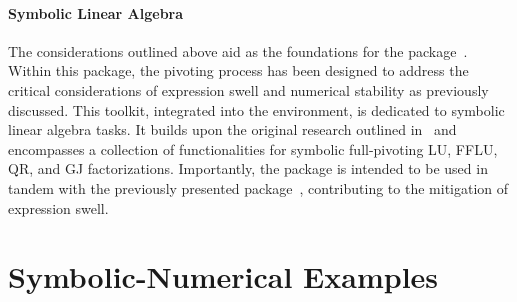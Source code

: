 \paragraph{Symbolic Linear Algebra} The considerations outlined above aid as the foundations for the \LAST{} package~\cite{last}. Within this package, the pivoting process has been designed to address the critical considerations of expression swell and numerical stability as previously discussed. This toolkit, integrated into the \Maple{} environment, is dedicated to symbolic linear algebra tasks. It builds upon the original research outlined in~\cite{zhou2008fraction} and encompasses a collection of functionalities for symbolic full-pivoting \ac{LU}, \ac{FFLU}, QR, and \ac{GJ} factorizations. Importantly, the \LAST{} package is intended to be used in tandem with the previously presented \LEM{} package~\cite{lem}, contributing to the mitigation of expression swell.


\section{Symbolic-Numerical Examples}
\label{chap6:sec:examples}

